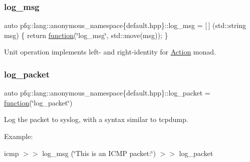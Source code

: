 \subsubsection{\texorpdfstring{log\+\_\+msg}{log\_msg}}
{\footnotesize\ttfamily auto pfq\+::lang\+::anonymous\+\_\+namespace\{default.\+hpp\}\+::log\+\_\+msg = \mbox{[}$\,$\mbox{]} (std\+::string msg) \{ return \hyperlink{namespacepfq_1_1lang_a1a4638059d700ae08d0ca63886ff2bb3}{function}(\char`\"{}log\+\_\+msg\char`\"{}, std\+::move(msg)); \}}



Unit operation implements left-\/ and right-\/identity for \hyperlink{structpfq_1_1lang_1_1Action}{Action} monad. 

\mbox{\label{namespacepfq_1_1lang_1_1anonymous__namespace_02default_8hpp_03_aed6076a98aece625738cbda3689183e2}} 
\subsubsection{\texorpdfstring{log\+\_\+packet}{log\_packet}}
{\footnotesize\ttfamily auto pfq\+::lang\+::anonymous\+\_\+namespace\{default.\+hpp\}\+::log\+\_\+packet = \hyperlink{namespacepfq_1_1lang_a1a4638059d700ae08d0ca63886ff2bb3}{function}(\char`\"{}log\+\_\+packet\char`\"{})}



Log the packet to syslog, with a syntax similar to tcpdump. 

Example\+:

icmp $>$$>$ log\+\_\+msg (\char`\"{}\+This is an I\+C\+M\+P packet\+:\char`\"{}) $>$$>$ log\+\_\+packet \mbox{\label{namespacepfq_1_1lang_1_1anonymous__namespace_02default_8hpp_03_a7b831baeabda070b89ca862a9445a4a8}} 
